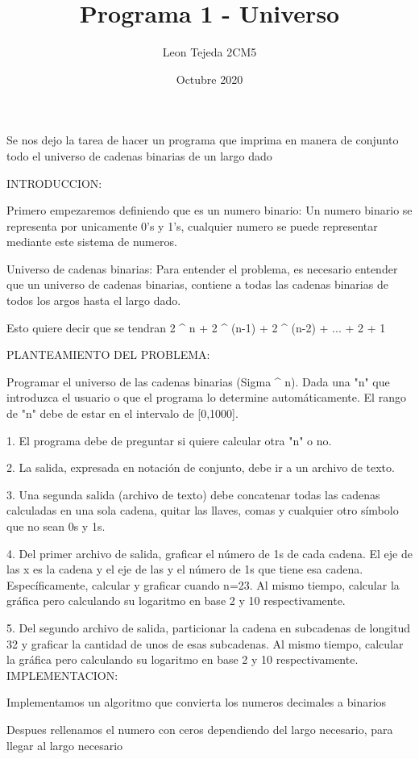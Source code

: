 \documentclass{article}
\title{Programa 1 - Universo}
\author{Leon Tejeda 2CM5}
\date{Octubre 2020}
\begin{document}
\maketitle
\begin{flushleft}
Se nos dejo la tarea de hacer un programa que imprima en manera de conjunto todo el universo de cadenas binarias de un largo dado

INTRODUCCION:

Primero empezaremos definiendo que es un numero binario: 	Un numero binario se representa por unicamente 0's y 1's, cualquier numero se puede representar mediante este sistema de numeros.

Universo de cadenas binarias:	Para entender el problema, es necesario entender que un universo de cadenas binarias, contiene a todas las cadenas binarias de todos los argos hasta el largo dado.

					Esto quiere decir que se tendran 2 \^{}  n + 2  \^{}  (n-1) + 2  \^{}  (n-2) + ... + 2 + 1 

PLANTEAMIENTO DEL PROBLEMA:

Programar el universo de las cadenas binarias (Sigma \^{} n). Dada una "n" que introduzca el usuario o que el programa lo determine automáticamente. El rango de "n" debe de estar en el intervalo de [0,1000].

1. El programa debe de preguntar si quiere calcular otra "n" o no.

2. La salida, expresada en notación de conjunto, debe ir a un archivo de texto.

3. Una segunda salida (archivo de texto) debe concatenar todas las cadenas calculadas en una sola cadena, quitar las llaves, comas y cualquier otro símbolo que no sean 0s y 1s.

4. Del primer archivo de salida, graficar el número de 1s de cada cadena. El eje de las x es la cadena y el eje de las y el número de 1s que tiene esa cadena. Específicamente, calcular y graficar cuando n=23. Al mismo tiempo, calcular la gráfica pero calculando su logaritmo en base 2 y 10 respectivamente.

5. Del segundo archivo de salida, particionar la cadena en subcadenas de longitud 32 y graficar la cantidad de unos de esas subcadenas. Al mismo tiempo, calcular la gráfica pero calculando su logaritmo en base 2 y 10 respectivamente.
IMPLEMENTACION:

Implementamos un algoritmo que convierta los numeros decimales a binarios

Despues rellenamos el numero con ceros dependiendo del largo necesario, para llegar al largo necesario


\end{flushleft}
\end{document}
